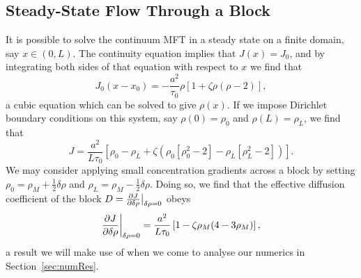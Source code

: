 \subsection{Steady-State Flow Through a Block}
It is possible to solve the continuum MFT in a steady state on a finite domain, say $x\in(0, L)$. The continuity equation implies that $J(x)=J_0$, and by integrating both sides of that equation with respect to $x$ we find that
\begin{equation}
 J_0 (x-x_0) = -\frac{a^2}{\tau_0} \rho \left[1+\zeta \rho\left(\rho-2\right)\right],
\end{equation}
a cubic equation which can be solved to give $\rho(x)$. If we impose Dirichlet boundary conditions on this system, say $\rho(0)=\rho_0$ and $\rho(L)=\rho_L$, we find that
\begin{equation}
 J = \frac{a^2}{L \tau_0} \left[ \rho_0 - \rho_L + \zeta \left( \rho_0\left[\rho_0^2-2\right] - \rho_L\left[\rho_L^2-2\right] \right) \right].
\end{equation}
We may consider applying small concentration gradients across a block by setting $\rho_0 = \rho_M + \frac{1}{2}\delta\rho$ and $\rho_L = \rho_M - \frac{1}{2}\delta\rho$. Doing so, we find that the effective diffusion coefficient of the block
$D=\frac{\partial J}{\partial \delta\rho}\big|_{\delta\rho=0}$ obeys
\begin{equation}
\label{eq:MFTflow}
 \frac{\partial J}{\partial \delta\rho}\bigg|_{\delta\rho=0} = \frac{a^2}{L \tau_0} \left[ 1 - \zeta\rho_M(4-3\rho_M) \right],
\end{equation}
a result we will make use of when we come to analyse our numerics in Section~\ref{sec:numRes}.